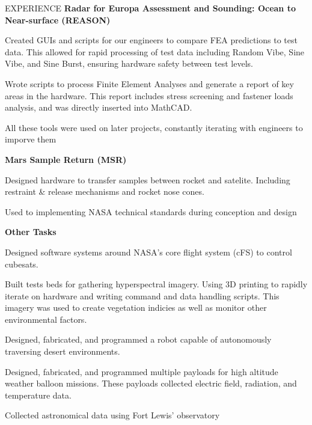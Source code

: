 \documentclass{resume} %
\begin{document}
\begin{newSection}{EXPERIENCE}
    {\bf\hspace{0.6em} {Radar for Europa Assessment and Sounding: Ocean to Near-surface (REASON)} }
    \begin{myList}
        \item Created GUIs and scripts for our engineers to compare FEA predictions to test data. This allowed for rapid processing of test data including Random Vibe, Sine Vibe, and Sine Burst, ensuring hardware safety between test levels.
        \item Wrote scripts to process Finite Element Analyses and generate a report of key areas in the hardware. This report includes stress screening and fastener loads analysis, and was directly inserted into MathCAD.
        \item All these tools were used on later projects, constantly iterating with engineers to imporve them
    \end{myList}\vspace{1mm}

    {\bf\hspace{0.6em} {Mars Sample Return (MSR)}}
    \begin{myList} 
        \item Designed hardware to transfer samples between rocket and satelite. Including restraint \& release mechanisms and rocket nose cones.
        \item Used to implementing NASA technical standards during conception and design 
    \end{myList}
    \vspace{1mm}

    {\bf\hspace{0.6em} {Other Tasks}}
    \begin{myList} 
        \item Designed software systems around NASA's core flight system (cFS) to control cubesats.
        \item Built tests beds for gathering hyperspectral imagery. Using 3D printing to rapidly iterate on hardware and writing command and data handling scripts. This imagery was used to create vegetation indicies as well as monitor other environmental factors.
    \end{myList}
    \vspace{1mm}
    
    \begin{myList}
        \item Designed, fabricated, and programmed a robot capable of autonomously traversing desert environments.
        \item Designed, fabricated, and programmed multiple payloads for high altitude weather balloon missions. These payloads collected electric field, radiation, and temperature data.
        \item Collected astronomical data using Fort Lewis' observatory
    \end{myList}
    \vspace{1mm}
    

\end{newSection}
\end{document}
